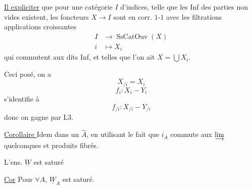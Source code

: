 
\uline{Il  expliciter} que pour une catégorie $I$ d'indices, telle que les Inf des parties non vides existent, les foncteurs $X\longrightarrow I$ sont en corr. $1$-$1$ avec les filtrations  applications croissantes
\[
\begin{aligned}I&\longrightarrow\operatorname{SsCatOuv}(X)\\i&\longmapsto X_i\end{aligned}
\]
qui commutent aux dits Inf, et telles que l'on ait $X=\bigcup X_i$.

Ceci posé, on a
\[
X_{/i}=X_i
\]
\[
f_i:X_i\mathbin{-}Y_i
\]
s'identifie à
\[
f_{/i}:X_{/i}\mathbin{-}Y_{/i}
\]
donc on gagne par L3.

\margin{$\vert$}
\uline{Corollaire } Idem dans un $\widehat A$, en utilisant le fait que $i_A$ commute aux \uline{$\varinjlim$} quelconques et  produits fibrés.


 L'ens. $\underline W$ est saturé

\uline{Cor} Pour $\forall A$, $\underline W_A$ est saturé.

